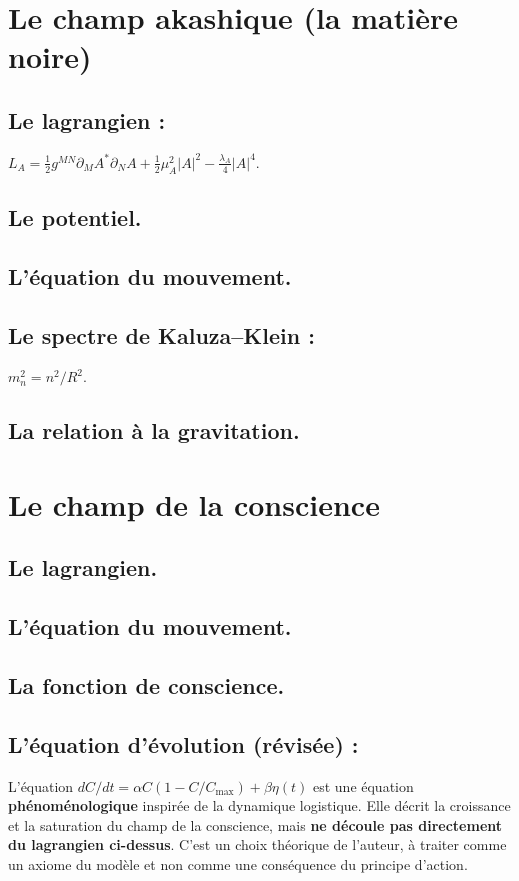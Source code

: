 \documentclass[11pt,a4paper]{article}
\begin{document}
\section{Le champ akashique (la matière noire)}
\subsection{Le lagrangien :} $L_A = \frac{1}{2} g^{MN} \partial_M A^* \partial_N A + \frac{1}{2} \mu_A^2 |A|^2 - \frac{\lambda_A}{4} |A|^4$.
\subsection{Le potentiel.}
\subsection{L'équation du mouvement.}
\subsection{Le spectre de Kaluza--Klein :} $m_n^2 = n^2/R^2$.
\subsection{La relation à la gravitation.}

\section{Le champ de la conscience}
\subsection{Le lagrangien.}
\subsection{L'équation du mouvement.}
\subsection{La fonction de conscience.}
\subsection{L'équation d'évolution (révisée) :} L'équation $dC/dt = \alpha C (1 - C/C_{\text{max}}) + \beta \eta(t)$ est une équation \textbf{phénoménologique} inspirée de la dynamique logistique. Elle décrit la croissance et la saturation du champ de la conscience, mais \textbf{ne découle pas directement du lagrangien ci-dessus}. C'est un choix théorique de l'auteur, à traiter comme un axiome du modèle et non comme une conséquence du principe d'action.
\end{document}
